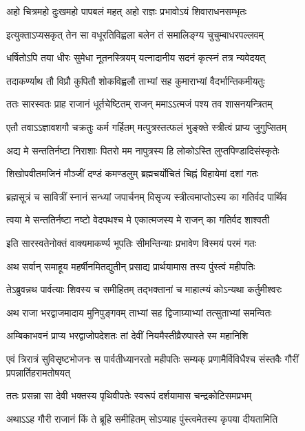 \begin{center}
\twolineshloka
{अहो चित्रमहो दुःखमहो पापबलं महत्}
{अहो राज्ञः प्रभावोऽयं शिवाराधनसम्भृतः} %

\twolineshloka
{इत्युक्ताऽप्यसकृत् तेन सा वधूरतिविह्वला}
{बलेन तं समालिङ्ग्य चुचुम्बाधरपल्लवम्} %

\twolineshloka
{धर्षितोऽपि तया धीरः सुमेधा नूतनस्त्रियम्}
{यत्नादानीय सदनं कृत्स्नं तत्र न्यवेदयत्} %

\twolineshloka
{तदाकर्ण्याथ तौ विप्रौ कुपितौ शोकविह्वलौ}
{ताभ्यां सह कुमाराभ्यां वैदर्भान्तिकमीयतुः} %

\twolineshloka
{ततः सारस्वतः प्राह राजानं धूर्तचेष्टितम्}
{राजन् ममाऽऽत्मजं पश्य तव शासनयन्त्रितम्} %

\twolineshloka
{एतौ तवाऽऽज्ञावशगौ चक्रतुः कर्म गर्हितम्}
{मत्पुत्रस्तत्फलं भुङ्क्ते स्त्रीत्वं प्राप्य जुगुप्सितम्} %

\twolineshloka
{अद्य मे सन्ततिर्नष्टा निराशाः पितरो मम}
{नापुत्रस्य हि लोकोऽस्ति लुप्तपिण्डादिसंस्कृतेः} %

\twolineshloka
{शिखोपवीतमजिनं मौञ्जीं दण्डं कमण्डलुम्}
{ब्रह्मचर्योचितं चिह्नं विहायेमां दशां गतः} %

\twolineshloka
{ब्रह्मसूत्रं च सावित्रीं स्नानं सन्ध्यां जपार्चनम्}
{विसृज्य स्त्रीत्वमाप्तोऽस्य का गतिर्वद पार्थिव} %

\twolineshloka
{त्वया मे सन्ततिर्नष्टा नष्टो वेदपथश्च मे}
{एकात्मजस्य मे राजन् का गतिर्वद शाश्वती} %

\twolineshloka
{इति सारस्वतेनोक्तं वाक्यमाकर्ण्य भूपतिः}
{सीमन्तिन्याः प्रभावेण विस्मयं परमं गतः} %

\twolineshloka
{अथ सर्वान् समाहूय महर्षीनमितद्युतीन्}
{प्रसाद्य प्रार्थयामास तस्य पुंस्त्वं महीपतिः} %

\twolineshloka
{तेऽब्रुवन्नथ पार्वत्याः शिवस्य च समीहितम्}
{तद्भक्तानां च माहात्म्यं कोऽन्यथा कर्तुमीश्वरः} %

\twolineshloka
{अथ राजा भरद्वाजमादाय मुनिपुङ्गवम्}
{ताभ्यां सह द्विजाग्र्याभ्यां तत्सुताभ्यां समन्वितः} %

\twolineshloka
{अम्बिकाभवनं प्राप्य भरद्वाजोपदेशतः}
{तां देवीं नियमैस्तीव्रैरुपास्ते स्म महानिशि} %

\fourlineindentedshloka
{एवं त्रिरात्रं सुविसृष्टभोजनः}
{स पार्वतीध्यानरतो महीपतिः}
{सम्यक् प्रणामैर्विविधैश्च संस्तवैः}
{गौरीं प्रपन्नार्तिहरामतोषयत्} %

\twolineshloka
{ततः प्रसन्ना सा देवी भक्तस्य पृथिवीपतेः}
{स्वरूपं दर्शयामास चन्द्रकोटिसमप्रभम्} %

\twolineshloka
{अथाऽऽह गौरी राजानं किं ते ब्रूहि समीहितम्}
{सोऽप्याह पुंस्त्वमेतस्य कृपया दीयतामिति} %


\end{center}

